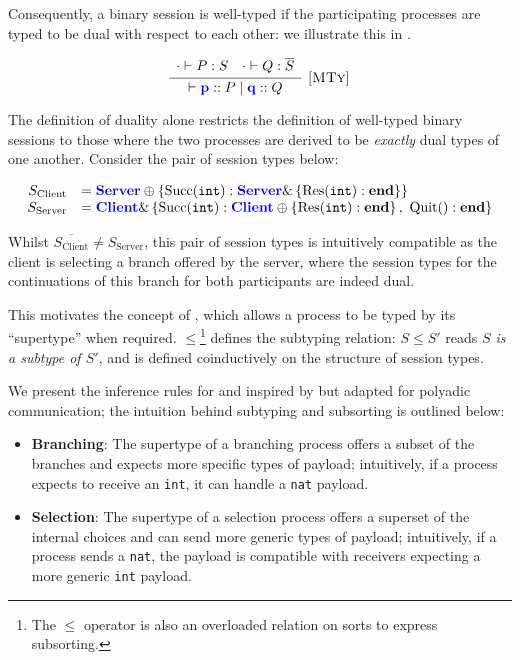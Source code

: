 Consequently, a binary session is well-typed if the participating processes are typed to be dual with respect to each other: we illustrate this in .

\[
\infer[\mbox{\rulename{MTy}}]{
	\vdash \parti{p} :: P \mid 
	\parti{q} :: Q
}{
	\begin{array}{lr}
	\cdot \vdash P: S
	&
	\cdot \vdash Q: \overline{S}
	\end{array}
}
\]

The definition of duality alone restricts the definition of well-typed binary sessions to those where the two processes are derived to be \textit{exactly} dual types of one another. Consider the pair of session types below:

\[
\begin{array}{rl}
S_{\text{Client}} &= {\color{blue}\mathbf{Server}} \oplus \left\{\text{Succ}(\texttt{int}): {\color{blue}\mathbf{Server}} \& \left\{\text{Res}(\texttt{int}): \mathbf{end}\right\}\right\} \\
S_{\text{Server}} &= {\color{blue}\mathbf{Client}} \& \left\{\text{Succ}(\texttt{int}): {\color{blue}\mathbf{Client}} \oplus \left\{\text{Res}(\texttt{int}): \mathbf{end}\right\},~\text{Quit}(): \mathbf{end}\right\}
\end{array}
\]

Whilst $\overline{S_{\text{Client}}} \neq S_{\text{Server}}$, this pair of session types is intuitively compatible as the client is selecting a branch offered by the server, where the session types for the continuations of this branch for both participants are indeed dual.

This motivates the concept of , which allows a process to be typed by its ``supertype'' when required. $\leqslant$\footnote{The $\leqslant$ operator is also an overloaded relation on sorts to express subsorting.} defines the subtyping relation: $S \leqslant S'$ reads \textit{$S$ is a subtype of $S'$}, and is defined coinductively on the structure of session types.

We present the inference rules for  and  inspired by \cite{MPST} but adapted for polyadic communication; the intuition behind subtyping and subsorting is outlined below:

\begin{itemize}
\item \textbf{Branching}: The supertype of a branching process offers a subset of the branches and expects more specific types of payload; intuitively, if a process expects to receive an \texttt{int}, it can handle a \texttt{nat} payload.
\item \textbf{Selection}: The supertype of a selection process offers a superset of the internal choices and can send more generic types of payload; intuitively, if a process sends a \texttt{nat}, the payload is compatible with receivers expecting a more generic \texttt{int} payload.
\end{itemize}

